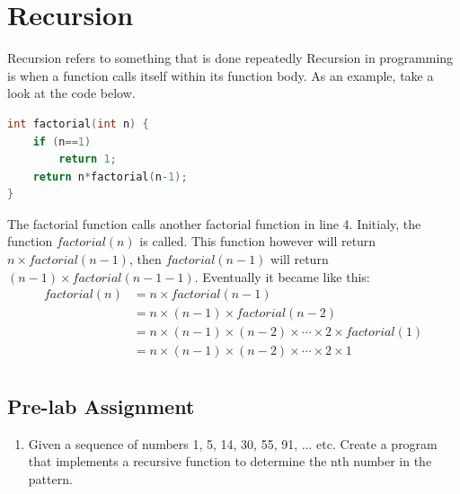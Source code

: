 \section{Recursion}
Recursion refers to something that is done repeatedly
Recursion in programming is when a function calls itself within its function body.
As an example, take a look at the code below.
\begin{lstlisting}[language=c,caption = Factorial with a recursion,label=lst:recursionexample01]
    int factorial(int n) {
    if (n==1)
        return 1;
    return n*factorial(n-1);
}
\end{lstlisting}
The factorial function calls another factorial function in line 4.
Initialy, the function $factorial(n)$ is called. This function however will return
$n\times factorial(n-1)$, then $factorial(n-1)$ will return $(n-1)\times factorial(n-1-1)$.
Eventually it became like this:
\begin{equation*}
    \begin{split}
        factorial(n)& = n \times factorial(n-1)\\
        & = n \times (n-1) \times factorial(n-2)\\
        & = n \times (n-1) \times (n-2) \times \cdots \times 2 \times factorial(1)\\
        & = n \times (n-1) \times (n-2) \times \cdots \times 2 \times 1\\
    \end{split}
\end{equation*}

\subsection{Pre-lab Assignment}
\begin{enumerate}
    \item Given a sequence of numbers 1, 5, 14, 30, 55, 91, ... etc. Create a program that implements a recursive function to determine the nth number in the pattern.
\end{enumerate}